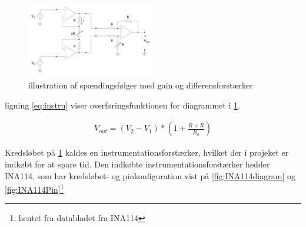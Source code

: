  \begin{figure}[H]
	\centering
	\includegraphics[width=0.5\textwidth]{billeder/Hardware/bufferampgaindifferens.JPG}
	\caption{illustration af spændingsfølger med gain og differensforstærker}
	\label{fig:bufferampmedgaindifferens}
\end{figure}

ligning \ref{eq:instru} viser overføringsfunktionen for diagrammet i \ref{fig:bufferampmedgaindifferens}.

\begin{align}
 V_{out}=(V_{2}-V_{1})*(1+\frac{R+R}{R_{a}})
 \label{eq:instru}
 \end{align} 
 
 Kredsløbet på \ref{fig:bufferampmedgaindifferens} kaldes en instrumentationsforstærker, hvilket der i projeket er indkøbt for at spare tid. Den indkøbte instrumentationsforstærker hedder INA114, som har kredsløbet- og pinkonfiguration vist på \ref{fig:INA114diagram} og \ref{fig:INA114Pin}\footnote{hentet fra databladet fra INA114}
 
